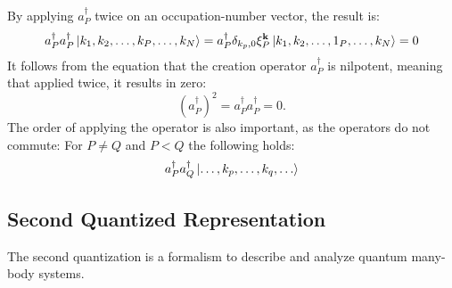 By applying $a_P^{\dagger}$ twice on an occupation-number vector, the result is:
\begin{align}
    a_P^{\dagger} a_P^{\dagger} \ket{k_1, k_2, \ldots, k_P, \ldots, k_N} = a_P^{\dagger} \delta_{k_p, 0} \xi_P^{\mathbf{k}} \ket{k_1, k_2, \ldots, 1_P, \ldots, k_N} = 0
\end{align}
It follows from the equation that the creation operator $a_P^{\dagger}$ is nilpotent, meaning that applied twice, it results in zero:
\begin{equation}
    (a_P^{\dagger})^2 = a_P^{\dagger} a_P^{\dagger} = 0.
\end{equation}
The order of applying the operator is also important, as the operators do not commute: 
For $P \neq Q$ and $P < Q$ the following holds:
\begin{equation}
    a_P^{\dagger} a_Q^{\dagger} \ket{\ldots, k_p, \ldots, k_q, \ldots}
\end{equation}

\subsection{Second Quantized Representation}




The second quantization is a formalism to describe and analyze quantum many-body systems. \cite{Altland}